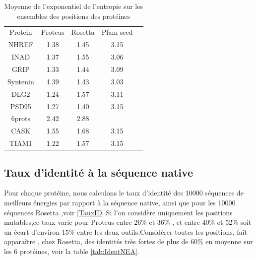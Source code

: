     \begin{table}[!htbp]
      \centering

      \begin{tabular}{ccccc}

        \toprule
        Protein & Proteus & Rosetta & Pfam seed \\
        \cmidrule{1-4}
        NHREF  & 1.38 & 1.45 & 3.15  \\
        INAD  & 1.37 & 1.55 & 3.06  \\
        GRIP  & 1.33 & 1.44 & 3.09  \\
        Syntenin  & 1.39 & 1.43 & 3.03  \\
        DLG2  & 1.24 & 1.57 & 3.11  \\
        PSD95  & 1.27 & 1.40 & 3.15  \\
        6prots & 2.42  & 2.88 &    \\
        \cmidrule{1-5}
        CASK  & 1.55 & 1.68 & 3.15  \\
        TIAM1 & 1.22 & 1.57 & 3.15  \\

        \bottomrule

      \end{tabular}      
      \caption{Moyenne de l'exponentiel de l'entropie sur les ensembles des positions des protéines}
\label{tab:Entropie_PDZ}      
    \end{table}


  
\subsection{Taux d'identité à la séquence native}  
  
Pour chaque protéine, nous calculons le taux d'identité des 10000 séquences de meilleurs énergies par rapport à la séquence native, ainsi que pour les 10000 séquences Rosetta ,voir \ref{TauxID}.Si l'on considère uniquement les positions mutables,ce taux varie pour Proteus entre 26\% et 36\% , et entre 40\% et 52\% soit un écart d'environ 15\% entre les deux outils.Considèrer toutes les positions, fait apparaître , chez Rosetta, des identités très fortes de plus de 60\% en moyenne sur les 6 protéines, voir la table \ref{tab:IdentNEA}.  

